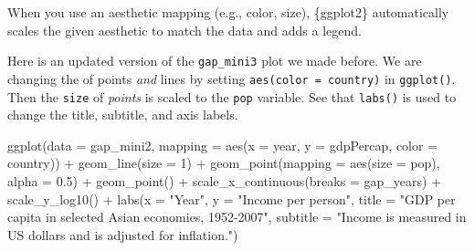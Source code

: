 \documentclass[
  letterpaper,
  DIV=11,
  numbers=noendperiod]{scrreprt}
\newenvironment{Shaded}{\begin{snugshade}}{\end{snugshade}}
\newcommand{\AttributeTok}[1]{\textcolor[rgb]{0.40,0.45,0.13}{#1}}
\newcommand{\DecValTok}[1]{\textcolor[rgb]{0.68,0.00,0.00}{#1}}
\newcommand{\FloatTok}[1]{\textcolor[rgb]{0.68,0.00,0.00}{#1}}
\newcommand{\FunctionTok}[1]{\textcolor[rgb]{0.28,0.35,0.67}{#1}}
\newcommand{\NormalTok}[1]{\textcolor[rgb]{0.00,0.23,0.31}{#1}}
\newcommand{\SpecialCharTok}[1]{\textcolor[rgb]{0.37,0.37,0.37}{#1}}
\newcommand{\StringTok}[1]{\textcolor[rgb]{0.13,0.47,0.30}{#1}}
\begin{document}
\begin{tcolorbox}[enhanced jigsaw, titlerule=0mm, colback=white, left=2mm, breakable, opacitybacktitle=0.6, colbacktitle=quarto-callout-note-color!10!white, colframe=quarto-callout-note-color-frame, bottomtitle=1mm, opacityback=0, coltitle=black, arc=.35mm, toptitle=1mm, title=\textcolor{quarto-callout-note-color}{\faInfo}\hspace{0.5em}{Challenge}, leftrule=.75mm, toprule=.15mm, bottomrule=.15mm, rightrule=.15mm]

When you use an aesthetic mapping (e.g., color, size), \{ggplot2\}
automatically scales the given aesthetic to match the data and adds a
legend.

Here is an updated version of the \texttt{gap\_mini3} plot we made
before. We are changing the of points \emph{and} lines by setting
\texttt{aes(color\ =\ country)} in \texttt{ggplot()}. Then the
\texttt{size} of \emph{points} is scaled to the \texttt{pop} variable.
See that \texttt{labs()} is used to change the title, subtitle, and axis
labels.

\begin{Shaded}
\begin{Highlighting}[]
\FunctionTok{ggplot}\NormalTok{(}\AttributeTok{data =}\NormalTok{ gap\_mini2, }
       \AttributeTok{mapping =} \FunctionTok{aes}\NormalTok{(}\AttributeTok{x =}\NormalTok{ year, }
                     \AttributeTok{y =}\NormalTok{ gdpPercap, }
                     \AttributeTok{color =}\NormalTok{ country)) }\SpecialCharTok{+}
  \FunctionTok{geom\_line}\NormalTok{(}\AttributeTok{size =} \DecValTok{1}\NormalTok{) }\SpecialCharTok{+}
  \FunctionTok{geom\_point}\NormalTok{(}\AttributeTok{mapping =} \FunctionTok{aes}\NormalTok{(}\AttributeTok{size =}\NormalTok{ pop),}
                           \AttributeTok{alpha =} \FloatTok{0.5}\NormalTok{) }\SpecialCharTok{+}
  \FunctionTok{geom\_point}\NormalTok{() }\SpecialCharTok{+}
  \FunctionTok{scale\_x\_continuous}\NormalTok{(}\AttributeTok{breaks =}\NormalTok{ gap\_years) }\SpecialCharTok{+}
  \FunctionTok{scale\_y\_log10}\NormalTok{()  }\SpecialCharTok{+}
  \FunctionTok{labs}\NormalTok{(}\AttributeTok{x =} \StringTok{"Year"}\NormalTok{, }
       \AttributeTok{y =} \StringTok{"Income per person"}\NormalTok{,}
       \AttributeTok{title =} \StringTok{"GDP per capita in selected Asian economies, 1952{-}2007"}\NormalTok{,}
       \AttributeTok{subtitle =} \StringTok{"Income is measured in US dollars and is adjusted for inflation."}\NormalTok{)}
\end{Highlighting}
\end{Shaded}


\end{tcolorbox}
\end{document}
